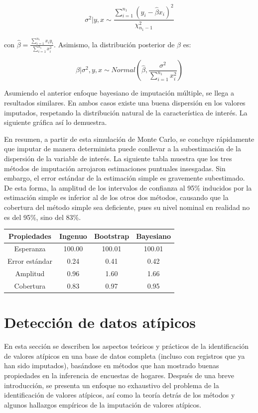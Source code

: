 \documentclass[
  12pt,
]{book}
\begin{document}
\[
\sigma^2| y, x  \sim \frac{\sum_{i = 1}^{n_1} (y_i - \hat{\beta} x_i)^2}{\chi ^2_{n_1-1}}
\]

con \(\hat{\beta} = \frac{\sum_{i = 1}^{n_1} x_i y_i}{\sum_{i = 1}^{n_1} x_i^2}\). Asimismo, la distribución posterior de \(\beta\) es:

\[
\beta | \sigma^2, y, x \sim Normal \left(\hat{\beta}, \frac{\sigma^2}{\sum_{i = 1}^{n_1} x_i^2} \right)
\]

Asumiendo el anterior enfoque bayesiano de imputación múltiple, se llega a resultados similares. En ambos casos existe una buena dispersión en los valores imputados, respetando la distribución natural de la característica de interés. La siguiente gráfica así lo demuestra.

En resumen, a partir de esta simulación de Monte Carlo, se concluye rápidamente que imputar de manera determinista puede conllevar a la subestimación de la dispersión de la variable de interés. La siguiente tabla muestra que los tres métodos de imputación arrojaron estimaciones puntuales insesgadas. Sin embargo, el error estándar de la estimación simple es gravemente subestimado. De esta forma, la amplitud de los intervalos de confianza al 95\% inducidos por la estimación simple es inferior al de los otros dos métodos, causando que la cobertura del método simple sea deficiente, pues su nivel nominal en realidad no es del 95\%, sino del 83\%.

\begin{longtable}[]{@{}cccc@{}}
\toprule()
Propiedades & Ingenuo & Bootstrap & Bayesiano \\
\midrule()
\endhead
Esperanza & 100.00 & 100.01 & 100.01 \\
Error estándar & 0.24 & 0.41 & 0.42 \\
Amplitud & 0.96 & 1.60 & 1.66 \\
Cobertura & 0.83 & 0.97 & 0.95 \\
\bottomrule()
\end{longtable}

\hypertarget{detecciuxf3n-de-datos-atuxedpicos}{%
\chapter{Detección de datos atípicos}\label{detecciuxf3n-de-datos-atuxedpicos}}

En esta sección se describen los aspectos teóricos y prácticos de la identificación de valores atípicos en una base de datos completa (incluso con registros que ya han sido imputados), basándose en métodos que han mostrado buenas propiedades en la inferencia de encuestas de hogares. Después de una breve introducción, se presenta un enfoque no exhaustivo del problema de la identificación de valores atípicos, así como la teoría detrás de los métodos y algunos hallazgos empíricos de la imputación de valores atípicos.
\end{document}
